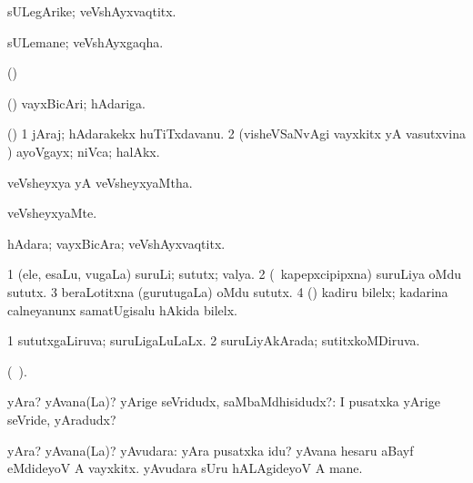 {{{{{{\bentry
{}
  \gl{\nA}\bmng
sULegArike; veVshAyxvaqtitx. 
\emng
\eentry

\bentry
{}
  \gl{\nA}\bmng
sULemane; veVshAyxgaqha. 
\emng
\eentry

\bentry
{}
  \gl{\nA}\bmng
(\pArxparx)  
\emng
\eentry

\bentry
{}
  \gl{\nA}\bmng
(\pArxparx) vayxBicAri; hAdariga. 
\emng
\eentry

\bentry
{}
  \gl{\nA}\bmng
{} 
\emng
\eentry

\bentry
{}
  \gl{\nA}\bmng
(\pArxparx) 
\bnum
\num{1} jAraj; hAdarakekx huTiTxdavanu. 
\num{2} (visheVSaNvAgi vayxkitx yA vasutxvina \vi) ayoVgayx; niVca; halAkx. 
\enum
\emng
\eentry

\bentry
{}
  \gl{\gu}\bmng
veVsheyxya yA veVsheyxyaMtha. 
\emng
\eentry

\bentry
{}
  \gl{\kirxvi}\bmng
veVsheyxyaMte. 
\emng
\eentry

\bentry
{}
  \gl{\nA}\bmng
hAdara; vayxBicAra; veVshAyxvaqtitx. 
\emng
\eentry

\bentry
{}
\gl{\nA}
\expl{}
\bmng
\bnum
\num{1} (ele, esaLu, \mo vugaLa) suruLi; sututx; valya. 
\num{2} (\kanmu\ kapepxcipipxna) suruLiya oMdu sututx. 
\num{3} beraLotitxna (gurutugaLa) oMdu sututx. 
\num{4} (\pArxparx) kadiru bilelx; kadarina calneyanunx samatUgisalu hAkida bilelx. 
\enum
\emng
\eentry

\bentry
{}
  \gl{\gu}\bmng
\bnum
\num{1} sututxgaLiruva; suruLigaLuLaLx.
\num{2} suruLiyAkArada; sutitxkoMDiruva. 
\enum
\emng
\eentry

\bentry
{}
  \gl{\nA}(\bava\ ). \bmng
{} 
\emng
\eentry

\bentry
{} 
\gl{\sanA}
\expl{}
\bmng
yAra? yAvana(La)? yArige seVridudx, saMbaMdhisidudx?:  I pusatxka yArige seVride, yAradudx? 
\emng
\eentry

\bentry
{} 
\gl{\gu}
\bmng
yAra? yAvana(La)? yAvudara:  yAra pusatxka idu?  yAvana hesaru aBayf eMdideyoV A vayxkitx.  yAvudara sUru hALAgideyoV A mane. 
\emng
\eentry

}}}}}}
